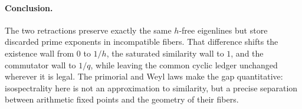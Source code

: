 \paragraph{Conclusion.}
The two retractions preserve exactly the same $h$-free eigenlines but store
discarded prime exponents in incompatible fibers.  That difference shifts
the existence wall from $0$ to $1/h$, the saturated similarity wall to
$1$, and the commutator wall to $1/q$, while leaving the common cyclic
ledger unchanged wherever it is legal.  The primorial and Weyl laws make the
gap quantitative: isospectrality here is not an approximation to similarity,
but a precise separation between arithmetic fixed points and the geometry of
their fibers.

